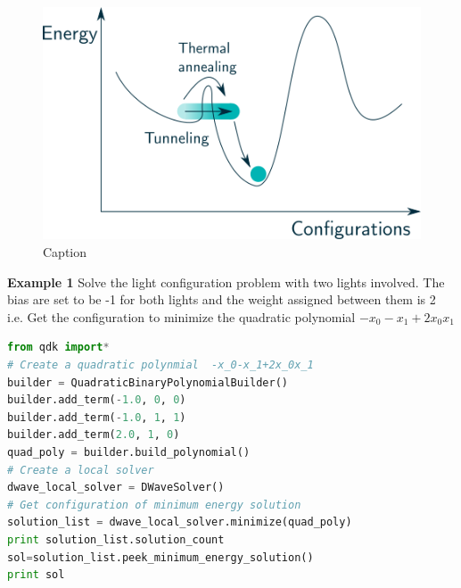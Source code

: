\begin{figure}[h!]
    \centering
    \includegraphics{figures/Tunneling.png}
    \caption{Caption}
    \label{fig:Tunnelling}
\end{figure}

\begin{tcolorbox}[standard jigsaw,
    opacityback=0,  %
    boxrule=0.5pt,label={example1}]
    {\bf Example 1}
    \tcbline
Solve the light configuration problem with two lights involved. The bias are set to be -1 for both lights and the weight assigned between them is 2 \\
i.e. Get the configuration to minimize the quadratic polynomial $-x_0-x_1+2x_0x_1$  
\end{tcolorbox}
\begin{lstlisting}[language=python]
from qdk import* 
# Create a quadratic polynmial  -x_0-x_1+2x_0x_1  
builder = QuadraticBinaryPolynomialBuilder() 
builder.add_term(-1.0, 0, 0) 
builder.add_term(-1.0, 1, 1) 
builder.add_term(2.0, 1, 0)  
quad_poly = builder.build_polynomial() 
# Create a local solver  
dwave_local_solver = DWaveSolver() 
# Get configuration of minimum energy solution 
solution_list = dwave_local_solver.minimize(quad_poly) 
print solution_list.solution_count 
sol=solution_list.peek_minimum_energy_solution() 
print sol 
\end{lstlisting}

